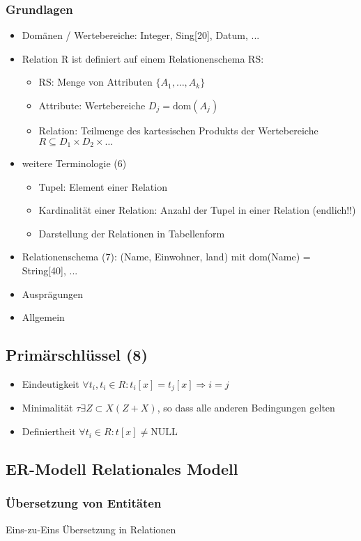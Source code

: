 \subsubsection{Grundlagen}
\begin{itemize}
	\item Domänen / Wertebereiche: Integer, Sing[20], Datum, ...
	\item Relation R ist definiert auf einem Relationenschema RS:
	\begin{itemize}
		\item RS: Menge von Attributen \(\{A_{1},\ldots,A_{k}\}\)
		\item Attribute: Wertebereiche \(D_{j} = \text{dom} (A_{j})\)
		\item Relation: Teilmenge des kartesischen Produkts der Wertebereiche \(R \subseteq D_{1}\times D_{2} \times \ldots \)
	\end{itemize}
	\item weitere Terminologie (6)
	\begin{itemize}
		\item Tupel: Element einer Relation
		\item Kardinalität einer Relation: Anzahl der Tupel in einer Relation (endlich!!)
		\item Darstellung der Relationen in Tabellenform
	\end{itemize}
	\item Relationenschema (7): (Name, Einwohner, land) mit dom(Name) = String[40], ...
	\item Ausprägungen
	\item Allgemein
\end{itemize}
\subsection{Primärschlüssel (8)}
	\begin{itemize}
		\item Eindeutigkeit \(\forall t_{i}, t_{i} \in R : t_{i}[x]=t_{j}[x] \Rightarrow i = j \)
		\item Minimalität \(\tau \exists Z \subset X(Z+X) \), so dass alle anderen Bedingungen gelten
		\item Definiertheit \(\forall t_{i} \in R : t[x] \ne \text{NULL}\)
	\end{itemize}
\subsection{ER-Modell Relationales Modell}
\subsubsection{Übersetzung von Entitäten}
Eins-zu-Eins Übersetzung in Relationen

